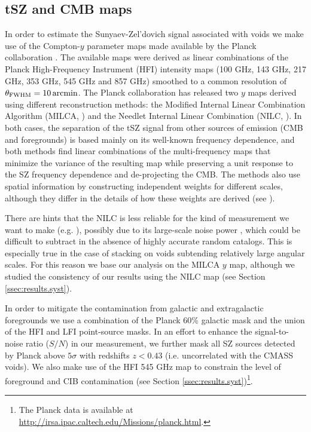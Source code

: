 \documentclass[twocolumn,amsfont,amssymb,amsmath, showpacs,balancelastpage, nofootinbib]{revtex4-1}
\begin{document}
    \subsection{tSZ and CMB maps}\label{ssec:data.cmb}
      In order to estimate the Sunyaev-Zel'dovich signal associated with voids we make use of
      the Compton-$y$ parameter maps made available by the Planck collaboration
      \cite{2016A&A...594A..22P}. The available maps were derived as linear combinations of
      the Planck High-Frequency Instrument (HFI) intensity maps (100 GHz, 143 GHz, 217 GHz,
      353 GHz, 545 GHz and 857 GHz) smoothed to a common resolution of
      $\theta_{\rm FWHM}=10\,{\rm arcmin}$. The Planck collaboration has released two
      $y$ maps derived using different reconstruction methods: the Modified Internal Linear
      Combination Algorithm (MILCA, \cite{2013A&A...558A.118H}) and the Needlet Internal
      Linear Combination (NILC, \cite{2011MNRAS.410.2481R}). In both cases, the separation
      of the tSZ signal from other sources of emission (CMB and foregrounds) is based mainly
      on its well-known frequency dependence, and both methods find linear combinations of
      the multi-frequency maps that minimize the variance of the resulting map while preserving
      a unit response to the SZ frequency dependence and de-projecting the CMB. The methods
      also use spatial information by constructing independent weights for different scales,
      although they differ in the details of how these weights are derived (see
      \cite{2016A&A...594A..22P}).
      
      There are hints that the NILC is less reliable for the kind of measurement we want to
      make (e.g. \cite{2017MNRAS.467.2315V}), possibly due to its large-scale noise power
      \cite{2016A&A...594A..22P}, which could be difficult to subtract in the absence of
      highly accurate random catalogs. This is especially true in the case of stacking on
      voids subtending relatively large angular scales. For this reason we base our
      analysis on the MILCA $y$ map, although we studied the consistency of our results
      using the NILC map (see Section \ref{ssec:results.syst}).
      
      In order to mitigate the contamination from galactic and extragalactic foregrounds
      we use a combination of the Planck 60\% galactic mask and the union of the HFI and
      LFI point-source masks. In an effort to enhance the signal-to-noise ratio ($S/N$)
      in our measurement, we further mask all SZ sources detected by Planck \cite{2016A&A...594A..27P}
      above $5\sigma$ with redshifts $z<0.43$ (i.e. uncorrelated with the CMASS voids).
      We also make use of the HFI 545 GHz map \cite{2016A&A...594A...1P} to constrain
      the level of foreground and CIB contamination (see Section
      \ref{ssec:results.syst})\footnote{The Planck data is available at
      \url{http://irsa.ipac.caltech.edu/Missions/planck.html}.}.
\end{document}
